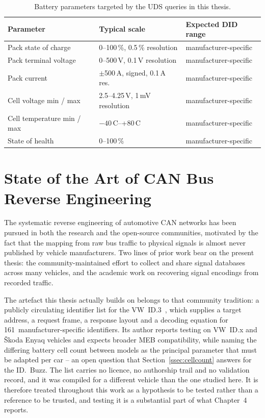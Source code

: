 \documentclass[11pt,a4paper,oneside,parskip=half]{scrreprt}
\begin{document}
\begin{table}[H]
\caption{Battery parameters targeted by the UDS queries in this thesis.}
\label{tab:battery_signals}
\centering
\begin{tabular}{lp{4cm}l}
\toprule
\textbf{Parameter}           & \textbf{Typical scale}             & \textbf{Expected DID range} \\
\midrule
Pack state of charge         & 0--100\,\%, 0.5\,\% resolution     & manufacturer-specific \\
Pack terminal voltage        & 0--500\,V, 0.1\,V resolution       & manufacturer-specific \\
Pack current                 & $\pm$500\,A, signed, 0.1\,A res.   & manufacturer-specific \\
Cell voltage min / max       & 2.5--4.25\,V, 1\,mV resolution     & manufacturer-specific \\
Cell temperature min / max   & $-40$\,\textdegree{}C--+80\,\textdegree{}C & manufacturer-specific \\
State of health              & 0--100\,\%                         & manufacturer-specific \\
\bottomrule
\end{tabular}
\end{table}

\section{State of the Art of CAN Bus Reverse Engineering}
\label{sec:sota}
The systematic reverse engineering of automotive CAN networks has been pursued in both the research and the open-source communities, motivated by the fact that the mapping from raw bus traffic to physical signals is almost never published by vehicle manufacturers. Two lines of prior work bear on the present thesis: the community-maintained effort to collect and share signal databases across many vehicles, and the academic work on recovering signal encodings from recorded traffic.

The artefact this thesis actually builds on belongs to that community tradition: a publicly circulating identifier list for the VW~ID.3~\cite{vwmebpidlist}, which supplies a target address, a request frame, a response layout and a decoding equation for 161~manufacturer-specific identifiers. Its author reports testing on VW~ID.x and \v{S}koda Enyaq vehicles and expects broader MEB compatibility, while naming the differing battery cell count between models as the principal parameter that must be adapted per car -- an open question that Section~\ref{ssec:cellcount} answers for the ID.~Buzz. The list carries no licence, no authorship trail and no validation record, and it was compiled for a different vehicle than the one studied here. It is therefore treated throughout this work as a hypothesis to be tested rather than a reference to be trusted, and testing it is a substantial part of what Chapter~4 reports.
\end{document}

